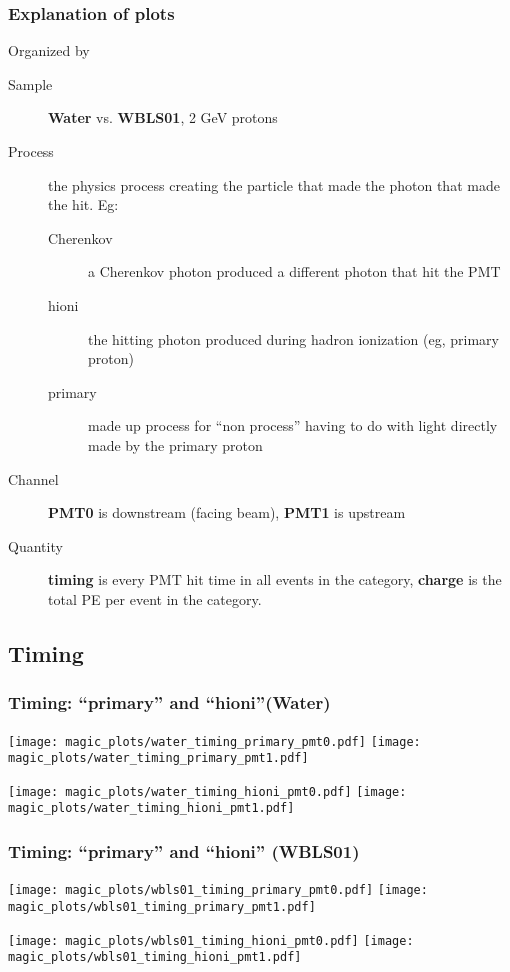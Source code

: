 \documentclass[xcolor=dvipsnames]{beamer}
\begin{document}
\begin{frame}
  \frametitle{Explanation of plots}
  Organized by 
  \begin{description}
  \item[Sample] \textbf{Water} vs. \textbf{WBLS01}, 2 GeV protons
  \item[Process] the physics process creating the particle that made
    the photon that made the hit.  Eg:
    \begin{description}
    \item[Cherenkov] a Cherenkov photon produced a different photon that hit the PMT
    \item[hioni] the hitting photon produced during hadron ionization (eg, primary proton)
    \item[primary] made up process for ``non process'' having to do with light directly made by the primary proton
    \end{description}
  \item[Channel] \textbf{PMT0} is downstream (facing beam), \textbf{PMT1} is upstream
  \item[Quantity] \textbf{timing} is every PMT hit time in all events in the category, \textbf{charge} is the total PE per event in the category.
  \end{description}
\end{frame}



\subsection{Timing}

\begin{frame}[fragile]
  \frametitle{Timing:  ``primary'' and ``hioni''(Water)}

\texttt{[image: magic\_plots/water\_timing\_primary\_pmt0.pdf]}%
\texttt{[image: magic\_plots/water\_timing\_primary\_pmt1.pdf]}%

\texttt{[image: magic\_plots/water\_timing\_hioni\_pmt0.pdf]}%
\texttt{[image: magic\_plots/water\_timing\_hioni\_pmt1.pdf]}%
\end{frame}

\begin{frame}[fragile]
  \frametitle{Timing: ``primary'' and ``hioni'' (WBLS01)}

\texttt{[image: magic\_plots/wbls01\_timing\_primary\_pmt0.pdf]}%
\texttt{[image: magic\_plots/wbls01\_timing\_primary\_pmt1.pdf]}%

\texttt{[image: magic\_plots/wbls01\_timing\_hioni\_pmt0.pdf]}%
\texttt{[image: magic\_plots/wbls01\_timing\_hioni\_pmt1.pdf]}%
\end{frame}
\end{document}
